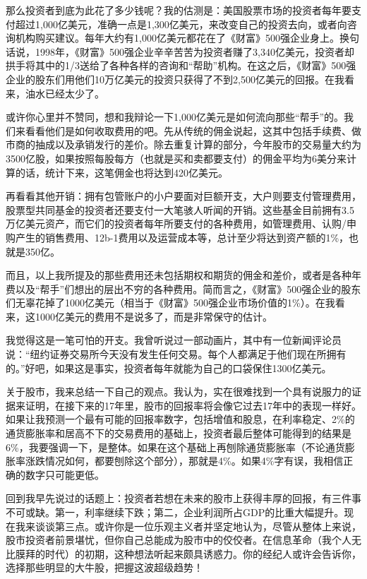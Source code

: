 \documentclass[UTF8,a4paper,zihao=-4,fontset = windows]{ctexart} %
\begin{document}
那么投资者到底为此花了多少钱呢？我的估测是：美国股票市场的投资者每年要支付超过1,000亿美元，准确一点是1,300亿美元，来改变自己的投资去向，或者向咨询机构购买建议。每年大约有1,000亿美元都花在了《财富》500强企业身上。换句话说，1998年，《财富》500强企业辛辛苦苦为投资者赚了3,340亿美元，投资者却拱手将其中的1/3送给了各种各样的咨询和“帮助”机构。在这之后，《财富》500强企业的股东们用他们10万亿美元的投资只获得了不到2,500亿美元的回报。在我看来，油水已经太少了。

或许你心里并不赞同，想和我辩论一下1,000亿美元是如何流向那些“帮手”的。我们来看看他们是如何收取费用的吧。先从传统的佣金说起，这其中包括手续费、做市商的抽成以及承销发行的差价。除去重复计算的部分，今年股市的交易量大约为3500亿股，如果按照每股每方（也就是买和卖都要支付）的佣金平均为6美分来计算的话，统计下来，这笔佣金也将达到420亿美元。

再看看其他开销：拥有包管账户的小户要面对巨额开支，大户则要支付管理费用，股票型共同基金的投资者还要支付一大笔骇人听闻的开销。这些基金目前拥有3.5万亿美元资产，而它们的投资者每年所要支付的各种费用，如管理费用、认购/申购产生的销售费用、12b-1费用以及运营成本等，总计至少将达到资产额的1\%，也就是350亿。

而且，以上我所提及的那些费用还未包括期权和期货的佣金和差价，或者是各种年费以及“帮手”们想出的层出不穷的各种费用。简而言之，《财富》500强企业的股东们无辜花掉了1000亿美元（相当于《财富》500强企业市场价值的1\%）。在我看来，这1000亿美元的费用不是说多了，而是非常保守的估计。

我觉得这是一笔可怕的开支。我曾听说过一部动画片，其中有一位新闻评论员说：“纽约证券交易所今天没有发生任何交易。每个人都满足于他们现在所拥有的。”好吧，如果这是事实，投资者每年就能为自己的口袋保住1300亿美元。

关于股市，我来总结一下自己的观点。我认为，实在很难找到一个具有说服力的证据来证明，在接下来的17年里，股市的回报率将会像它过去17年中的表现一样好。如果让我预测一个最有可能的回报率数字，包括增值和股息，在利率稳定、2\%的通货膨胀率和居高不下的交易费用的基础上，投资者最后整体可能得到的结果是6\%，我要强调一下，是整体。如果在这个基础上再刨除通货膨胀率（不论通货膨胀率涨跌情况如何，都要刨除这个部分），那就是4\%。如果4\%字有误，我相信正确的数字只可能更低。

回到我早先说过的话题上：投资者若想在未来的股市上获得丰厚的回报，有三件事不可或缺。第一，利率继续下跌；第二，企业利润所占GDP的比重大幅提升。现在我来谈谈第三点。或许你是一位乐观主义者并坚定地认为，尽管从整体上来说，股市投资者前景堪忧，但你自己总能成为股市中的佼佼者。在信息革命（我个人无比膜拜的时代）的初期，这种想法听起来颇具诱惑力。你的经纪人或许会告诉你，选择那些明显的大牛股，把握这波超级趋势！
\end{document}
